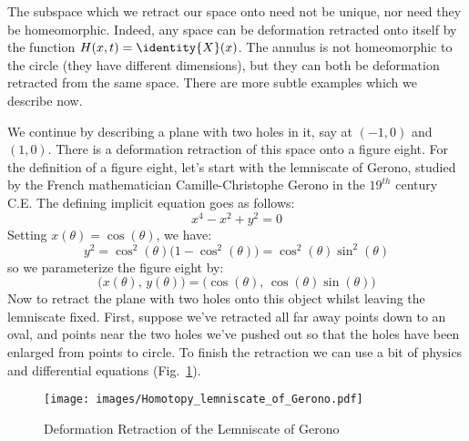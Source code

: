 \documentclass[oneside]{book}                                                  %
\begin{document}
                The subspace which we retract our space onto need not be unique,
                nor need they be homeomorphic. Indeed, any space can be
                deformation retracted onto itself by the function
                $H(x,t)=\identity{X}(x)$. The annulus is not homeomorphic to the
                circle (they have different dimensions), but they can both be
                deformation retracted from the same space. There are more subtle
                examples which we describe now.
                \par\hfill\par
                We continue by describing a plane with two holes in it,
                say at $(\minus{1},0)$ and $(1,0)$. There is a deformation
                retraction of this space onto a figure eight. For the definition
                of a figure eight, let's start with the lemniscate of Gerono,
                studied by the French mathematician Camille-Christophe Gerono in
                the $19^{th}$ century C.E. The defining implicit equation goes
                as follows:
                \begin{equation}
                    x^{4}-x^{2}+y^{2}=0
                \end{equation}
                Setting $x(\theta)=\cos(\theta)$, we have:
                \begin{equation}
                    y^{2}=\cos^{2}(\theta)\big(1-\cos^{2}(\theta)\big)
                         =\cos^{2}(\theta)\sin^{2}(\theta)
                \end{equation}
                so we parameterize the figure eight by:
                \begin{equation}
                    \big(x(\theta),\,y(\theta)\big)
                        =\big(\cos(\theta),\,\cos(\theta)\sin(\theta)\big)
                \end{equation}
                Now to retract the plane with two holes onto this object whilst
                leaving the lemniscate fixed. First, suppose we've retracted all
                far away points down to an oval, and points near the two holes
                we've pushed out so that the holes have been enlarged from
                points to circle. To finish the retraction we can use a bit of
                physics and differential equations
                (Fig.~\ref{fig:Deformation_Retraction_lemniscate_of_Gerono}).
                \begin{figure}
                    \centering
                    \captionsetup{type=figure}
                    \texttt{[image: images/Homotopy\_lemniscate\_of\_Gerono.pdf]}
                    \caption{Deformation Retraction of the Lemniscate of Gerono}
                    \label{fig:Deformation_Retraction_lemniscate_of_Gerono}
                \end{figure}
\end{document}
